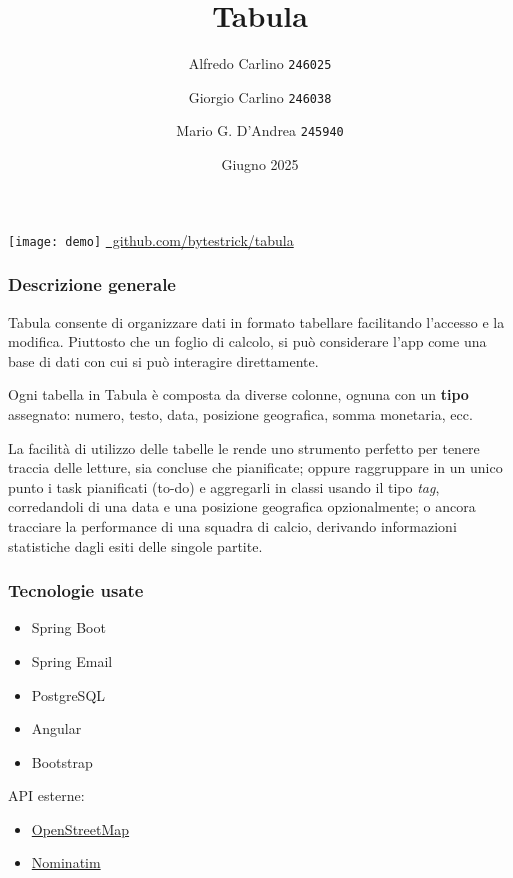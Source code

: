 \documentclass{beamer}
\title{Tabula}
\author{
  Alfredo Carlino \texttt{246025} \newline
  \and Giorgio Carlino \texttt{246038} \newline
  \and Mario G. D'Andrea \texttt{245940}}
\institute{Corso di Web Applications \\ C.d.S. Informatica $\cdot$ DeMaCs \\ Università della Calabria}
\date{Giugno 2025}
\begin{document}
\maketitle

\begin{frame}
  \texttt{[image: demo]}
  \centering  \href{https://github.com/bytestrick/tabula}{\faGithub\ github.com/bytestrick/tabula}
\end{frame}

\begin{frame}
  \frametitle{Descrizione generale}

  Tabula consente di organizzare dati in formato tabellare facilitando l'accesso e la modifica. Piuttosto che un foglio di calcolo, si può considerare l'app come una base di dati con cui si può interagire direttamente.

  \vspace{10pt}

  Ogni tabella in Tabula è composta da diverse colonne, ognuna con un \textbf{tipo} assegnato: numero, testo, data, posizione geografica, somma monetaria, ecc.

  \vspace{10pt}

  La facilità di utilizzo delle tabelle le rende uno strumento perfetto per tenere traccia delle letture, sia concluse che pianificate; oppure raggruppare in un unico punto i task pianificati (to-do) e aggregarli in classi usando il tipo \textit{tag}, corredandoli di una data e una posizione geografica opzionalmente; o ancora tracciare la performance di una squadra di calcio, derivando informazioni statistiche dagli esiti delle singole partite.

\end{frame}

\begin{frame}
  \frametitle{Tecnologie usate}

  \begin{itemize}
    \item[\faLeaf] Spring Boot
    \item[\faEnvelope] Spring Email
    \item[\faDatabase] PostgreSQL
  \end{itemize}

  \vspace{15pt}

  \begin{itemize}
    \item[\faHtml5] Angular
    \item[\faCss3] Bootstrap
  \end{itemize}

  \vspace{18pt}

  API esterne:
  \begin{itemize}
    \item[\faMapMarker] \href{https://www.openstreetmap.org/}{OpenStreetMap}
    \item[\faMapSigns] \href{https://nominatim.openstreetmap.org/}{Nominatim}
  \end{itemize}
\end{frame}
\end{document}

